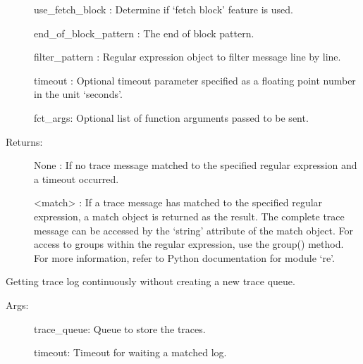 \documentclass[letterpaper,10pt,english]{sphinxmanual}
\begin{document}
\begin{fulllineitems}
\begin{fulllineitems}
\begin{description}
\sphinxAtStartPar
use\_fetch\_block : Determine if ‘fetch block’ feature is used.

\sphinxAtStartPar
end\_of\_block\_pattern : The end of block pattern.

\sphinxAtStartPar
filter\_pattern : Regular expression object to filter message line by line.

\sphinxAtStartPar
timeout :   Optional timeout parameter specified as a floating point number in the unit ‘seconds’.

\sphinxAtStartPar
fct\_args:   Optional list of function arguments passed to be sent.

\item[{Returns:}] \leavevmode
\sphinxAtStartPar
None :    If no trace message matched to the specified regular expression and a timeout occurred.

\sphinxAtStartPar
\textless{}match\textgreater{} : If a trace message has matched to the specified regular expression, a match object is returned as the result.                    The complete trace message can be accessed by the ‘string’ attribute of the match object.                    For access to groups within the regular expression, use the group() method.                    For more information, refer to Python documentation for module ‘re’.

\end{description}

\end{fulllineitems}


\begin{fulllineitems}
\label{\detokenize{QConnectBase:QConnectBase.connection_base.ConnectionBase.wait_4_trace_continuously}}
\sphinxAtStartPar
Getting trace log continuously without creating a new trace queue.
\begin{description}
\item[{Args:}] \leavevmode
\sphinxAtStartPar
trace\_queue: Queue to store the traces.

\sphinxAtStartPar
timeout: Timeout for waiting a matched log.


\end{description}
\end{fulllineitems}
\end{fulllineitems}
\end{document}
